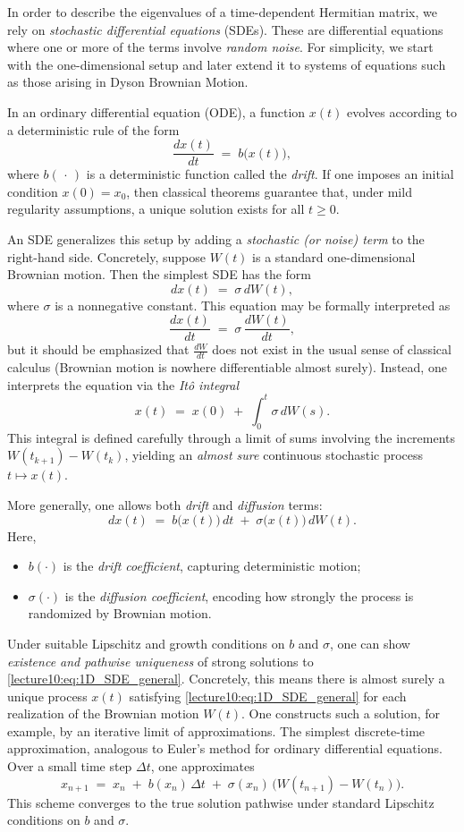 \documentclass[letterpaper,11pt,oneside,reqno]{book}
\numberwithin{equation}{chapter}  %
\theoremstyle{definition}
\begin{document}
In order to describe the eigenvalues of a time-dependent Hermitian matrix, we rely on \emph{stochastic differential equations} (SDEs). These are differential equations where one or more of the terms involve \emph{random noise}. For simplicity, we start with the one-dimensional setup and later extend it to systems of equations such as those arising in Dyson Brownian Motion.

In an ordinary differential equation (ODE), a function \(x(t)\) evolves according to a deterministic rule of the form
\[
\frac{dx(t)}{dt} \;=\; b\bigl(x(t)\bigr),
\]
where \(b(\,\cdot\,)\) is a deterministic function called the \emph{drift}. If one imposes an initial condition \(x(0)=x_0\), then classical theorems guarantee that, under mild regularity assumptions, a unique solution exists for all \(t\ge0\).

An SDE generalizes this setup by adding a \emph{stochastic (or noise) term} to the right-hand side. Concretely, suppose \(W(t)\) is a standard one-dimensional Brownian motion. Then the simplest SDE has the form
\[
dx(t) \;=\; \sigma\, dW(t),
\]
where \(\sigma\) is a nonnegative constant. This equation may be formally interpreted as
\[
\frac{dx(t)}{dt} \;=\; \sigma\,\frac{dW(t)}{dt},
\]
but it should be emphasized that \(\tfrac{dW}{dt}\) does not exist in the usual sense of classical calculus (Brownian motion is nowhere differentiable almost surely). Instead, one interprets the equation via the \emph{It\^{o} integral}
\[
x(t) \;=\; x(0)\;+\;\int_0^t \sigma\, dW(s).
\]
This integral is defined carefully through a limit of sums involving the increments \(W(t_{k+1})-W(t_k)\), yielding an \emph{almost sure} continuous stochastic process \(t\mapsto x(t)\).

\medskip
More generally, one allows both \emph{drift} and \emph{diffusion} terms:
\begin{equation}
\label{lecture10:eq:1D_SDE_general}
dx(t) \;=\; b\bigl(x(t)\bigr)\,dt \;+\; \sigma\bigl(x(t)\bigr)\,dW(t).
\end{equation}
Here,
\begin{itemize}
\item \(b(\cdot)\) is the \emph{drift coefficient}, capturing deterministic motion;
\item \(\sigma(\cdot)\) is the \emph{diffusion coefficient}, encoding how strongly the process is randomized by Brownian motion.
\end{itemize}
Under suitable Lipschitz and growth conditions on \(b\) and \(\sigma\), one can show \emph{existence and pathwise uniqueness} of strong solutions to \eqref{lecture10:eq:1D_SDE_general}. Concretely, this means there is almost surely a unique process \(x(t)\) satisfying \eqref{lecture10:eq:1D_SDE_general} for each realization of the Brownian motion \(W(t)\). One constructs such a solution, for example, by an iterative limit of approximations.
The simplest discrete-time approximation, analogous to Euler's method for ordinary differential equations. Over a small time step \(\Delta t\), one approximates
\[
x_{n+1} \;=\; x_n \;+\; b(x_n)\,\Delta t \;+\; \sigma(x_n)\,\bigl(W(t_{n+1}) - W(t_n)\bigr).
\]
This scheme converges to the true solution pathwise under standard Lipschitz conditions on \(b\) and \(\sigma\).
\end{document}
